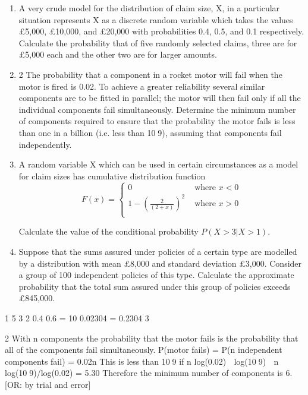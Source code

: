 \documentclass[a4paper,12pt]{article}
\begin{document}
\begin{enumerate}
\item A very crude model for the distribution of claim size, X, in a particular situation
represents X as a discrete random variable which takes the values £5,000, £10,000,
and £20,000 with probabilities 0.4, 0.5, and 0.1 respectively.
Calculate the probability that of five randomly selected claims, three are for £5,000
each and the other two are for larger amounts. 
\item 2 The probability that a component in a rocket motor will fail when the motor is fired is
0.02. To achieve a greater reliability several similar components are to be fitted in
parallel; the motor will then fail only if all the individual components fail
simultaneously.
Determine the minimum number of components required to ensure that the
probability the motor fails is less than one in a billion (i.e. less than 109), assuming
that components fail independently. 
\item A random variable X which can be used in certain circumstances as a model for claim
sizes has cumulative distribution function
\[F(x) = \begin{cases}
0 & \mbox{ where }  x < 0 \\ 
1 - \left(\frac{2}{(2+x)}\right)^2 & \mbox{ where }  x > 0 \\ 
\end{cases}
\]

Calculate the value of the conditional probability $P(X > 3|X > 1)$. 
\item Suppose that the sums assured under policies of a certain type are modelled by a
distribution with mean £8,000 and standard deviation £3,000. Consider a group of
100 independent policies of this type.
Calculate the approximate probability that the total sum assured under this group of
policies exceeds £845,000. 
\end{enumerate}
\newpage

1 5 3 2
0.4 0.6 = 10 0.02304 = 0.2304
3
 
  
 


2 With n components the probability that the motor fails is the probability that all of the
components fail simultaneously.
P(motor fails) = P(n independent components fail) = 0.02n
This is less than 109 if n log(0.02)  log(109)  n  log(109)/log(0.02) = 5.30
Therefore the minimum number of components is 6.
[OR: by trial and error]
\end{document}
